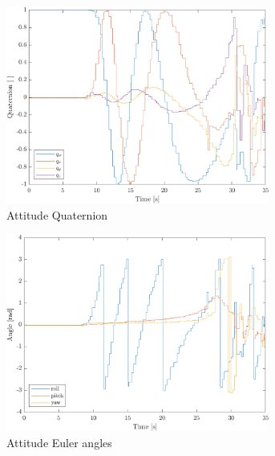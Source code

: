 \begin{figure}[ht]
    \centering   
    \begin{subfigure}{0.49\textwidth}
        \includegraphics[width=0.95\textwidth]{images-results/testflight_q.png}
        \caption{Attitude Quaternion}
        \label{fig:testflight-q}
    \end{subfigure}
    \begin{subfigure}{0.49\textwidth}
        \includegraphics[width=0.95\textwidth]{images-results/testflight_euler.png}
        \caption{Attitude Euler angles}
        \label{fig:testflight-euler}
    \end{subfigure}
    \begin{subfigure}{0.49\textwidth}

\end{subfigure}
\end{figure}
